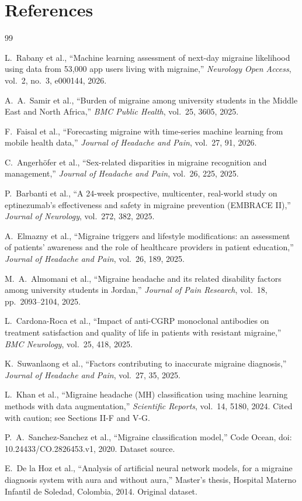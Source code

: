 \documentclass[conference]{IEEEtran}
\begin{document}
\section{References}
\renewcommand{\refname}{}
\begin{thebibliography}{99}

L.~Rabany et al., ``Machine learning assessment of next-day migraine likelihood using data from 53,000 app users living with migraine,'' \textit{Neurology Open Access}, vol.~2, no.~3, e000144, 2026.

A.~A.~Samir et al., ``Burden of migraine among university students in the Middle East and North Africa,'' \textit{BMC Public Health}, vol.~25, 3605, 2025.

F.~Faisal et al., ``Forecasting migraine with time-series machine learning from mobile health data,'' \textit{Journal of Headache and Pain}, vol.~27, 91, 2026.

C.~Angerh\"ofer et al., ``Sex-related disparities in migraine recognition and management,'' \textit{Journal of Headache and Pain}, vol.~26, 225, 2025.

P.~Barbanti et al., ``A 24-week prospective, multicenter, real-world study on eptinezumab's effectiveness and safety in migraine prevention (EMBRACE II),'' \textit{Journal of Neurology}, vol.~272, 382, 2025.

A.~Elmazny et al., ``Migraine triggers and lifestyle modifications: an assessment of patients' awareness and the role of healthcare providers in patient education,'' \textit{Journal of Headache and Pain}, vol.~26, 189, 2025.

M.~A.~Almomani et al., ``Migraine headache and its related disability factors among university students in Jordan,'' \textit{Journal of Pain Research}, vol.~18, pp.~2093--2104, 2025.

L.~Cardona-Roca et al., ``Impact of anti-CGRP monoclonal antibodies on treatment satisfaction and quality of life in patients with resistant migraine,'' \textit{BMC Neurology}, vol.~25, 418, 2025.

K.~Suwanlaong et al., ``Factors contributing to inaccurate migraine diagnosis,'' \textit{Journal of Headache and Pain}, vol.~27, 35, 2025.

L.~Khan et al., ``Migraine headache (MH) classification using machine learning methods with data augmentation,'' \textit{Scientific Reports}, vol.~14, 5180, 2024. Cited with caution; see Sections II-F and V-G.

P.~A.~Sanchez-Sanchez et al., ``Migraine classification model,'' Code Ocean, doi: 10.24433/CO.2826453.v1, 2020. Dataset source.

E.~De la Hoz et al., ``Analysis of artificial neural network models, for a migraine diagnosis system with aura and without aura,'' Master's thesis, Hospital Materno Infantil de Soledad, Colombia, 2014. Original dataset.

\end{thebibliography}
\end{document}
